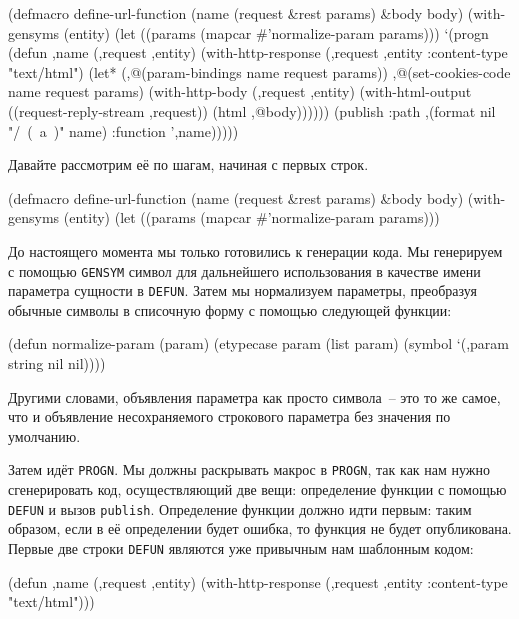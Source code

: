 \begin{myverb}
  (defmacro define-url-function (name (request &rest params) &body body)
    (with-gensyms (entity)
      (let ((params (mapcar #'normalize-param params)))
        `(progn
           (defun ,name (,request ,entity)
             (with-http-response (,request ,entity :content-type "text/html")
               (let* (,@(param-bindings name request params))
                 ,@(set-cookies-code name request params)
                 (with-http-body (,request ,entity)
                   (with-html-output ((request-reply-stream ,request))
                     (html ,@body))))))
           (publish :path ,(format nil "/~(~a~)" name) :function ',name)))))
\end{myverb}

Давайте рассмотрим её по шагам, начиная с первых строк.

\begin{myverb}
  (defmacro define-url-function (name (request &rest params) &body body)
    (with-gensyms (entity)
      (let ((params (mapcar #'normalize-param params)))
\end{myverb}

До настоящего момента мы только готовились к генерации кода. Мы генерируем с помощью
\lstinline{GENSYM} символ для дальнейшего использования в качестве имени параметра сущности в
\lstinline{DEFUN}. Затем мы нормализуем параметры, преобразуя обычные символы в списочную
форму с помощью следующей функции:

\begin{myverb}
  (defun normalize-param (param)
    (etypecase param
      (list param)
      (symbol `(,param string nil nil))))
\end{myverb}

Другими словами, объявления параметра как просто символа~-- это то же самое, что и
объявление несохраняемого строкового параметра без значения по умолчанию.

Затем идёт \lstinline{PROGN}. Мы должны раскрывать макрос в \lstinline{PROGN}, так как нам нужно
сгенерировать код, осуществляющий две вещи: определение функции с помощью \lstinline{DEFUN} и
вызов \lstinline{publish}. Определение функции должно идти первым: таким образом, если в её
определении будет ошибка, то функция не будет опубликована. Первые две строки
\lstinline{DEFUN} являются уже привычным нам шаблонным кодом:

\begin{myverb}
  (defun ,name (,request ,entity)
    (with-http-response (,request ,entity :content-type "text/html")))
\end{myverb}

